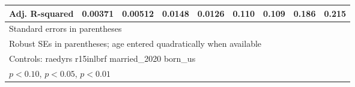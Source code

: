 \begin{table}[htbp]
\begin{tabular}{l*{8}{c}}
Adj. R-squared  &  0.00371         &  0.00512         &   0.0148         &   0.0126         &    0.110         &    0.109         &    0.186         &    0.215         \\
\bottomrule
\multicolumn{9}{l}{\footnotesize Standard errors in parentheses}\\
\multicolumn{9}{l}{\footnotesize Robust SEs in parentheses; age entered quadratically when available}\\
\multicolumn{9}{l}{\footnotesize Controls:  raedyrs r15inlbrf married\_2020 born\_us}\\
\multicolumn{9}{l}{\footnotesize \sym{*} \(p<0.10\), \sym{**} \(p<0.05\), \sym{***} \(p<0.01\)}\\
\end{tabular}
\end{table}
